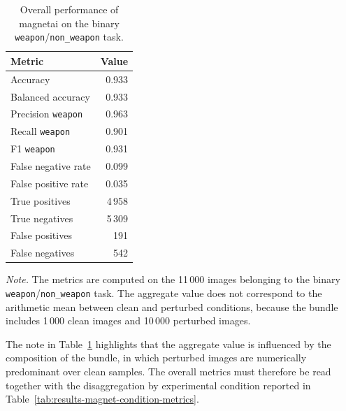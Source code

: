 \begin{table}[H]
\centering
\caption{Overall performance of \gls{magnetai} on the binary \texttt{weapon}/\texttt{non\_weapon} task.}
\label{tab:results-magnet-global-metrics}
\small
\begin{tabular}{lr}
\toprule
\textbf{Metric} & \textbf{Value} \\
\midrule
Accuracy & 0.933 \\
Balanced accuracy & 0.933 \\
Precision \texttt{weapon} & 0.963 \\
Recall \texttt{weapon} & 0.901 \\
F1 \texttt{weapon} & 0.931 \\
False negative rate & 0.099 \\
False positive rate & 0.035 \\
True positives & 4\,958 \\
True negatives & 5\,309 \\
False positives & 191 \\
False negatives & 542 \\
\bottomrule
\end{tabular}

\vspace{0.4em}
\footnotesize
\textit{Note.} The metrics are computed on the 11\,000 images belonging to the
binary \texttt{weapon}/\texttt{non\_weapon} task. The aggregate value does not
correspond to the arithmetic mean between clean and perturbed conditions,
because the bundle includes 1\,000 clean images and 10\,000 perturbed images.
\end{table}

The note in Table~\ref{tab:results-magnet-global-metrics} highlights that the
aggregate value is influenced by the composition of the bundle, in which
perturbed images are numerically predominant over clean samples. The overall
metrics must therefore be read together with the disaggregation by experimental
condition reported in Table~\ref{tab:results-magnet-condition-metrics}.

